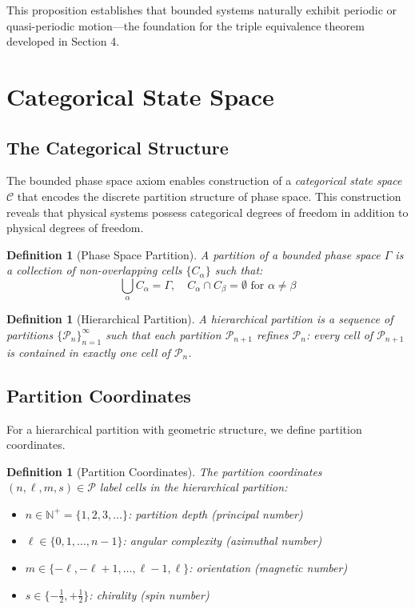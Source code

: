 \documentclass[twocolumn,10pt,twoside]{article}
\newtheorem{definition}[theorem]{Definition}
\newcommand{\N}{\mathbb{N}}
\newcommand{\Cat}{\mathcal{C}}
\newcommand{\Part}{\mathcal{P}}
\newcommand{\partcoord}{(n,\ell,m,s)}
\begin{document}
This proposition establishes that bounded systems naturally exhibit periodic or quasi-periodic motion---the foundation for the triple equivalence theorem developed in Section 4.

\section{Categorical State Space}

\subsection{The Categorical Structure}

The bounded phase space axiom enables construction of a \textit{categorical state space} $\Cat$ that encodes the discrete partition structure of phase space. This construction reveals that physical systems possess categorical degrees of freedom in addition to physical degrees of freedom.

\begin{definition}[Phase Space Partition]
A partition of a bounded phase space $\Gamma$ is a collection of non-overlapping cells $\{C_\alpha\}$ such that:
\begin{equation}
\bigcup_\alpha C_\alpha = \Gamma, \quad C_\alpha \cap C_\beta = \emptyset \text{ for } \alpha \neq \beta
\end{equation}
\end{definition}

\begin{definition}[Hierarchical Partition]
A hierarchical partition is a sequence of partitions $\{\mathcal{P}_n\}_{n=1}^{\infty}$ such that each partition $\mathcal{P}_{n+1}$ refines $\mathcal{P}_n$: every cell of $\mathcal{P}_{n+1}$ is contained in exactly one cell of $\mathcal{P}_n$.
\end{definition}

\subsection{Partition Coordinates}

For a hierarchical partition with geometric structure, we define partition coordinates.

\begin{definition}[Partition Coordinates]
\label{def:partition_coords}
The partition coordinates $\partcoord \in \Part$ label cells in the hierarchical partition:
\begin{itemize}
    \item $n \in \N^+ = \{1, 2, 3, \ldots\}$: partition depth (principal number)
    \item $\ell \in \{0, 1, \ldots, n-1\}$: angular complexity (azimuthal number)
    \item $m \in \{-\ell, -\ell+1, \ldots, \ell-1, \ell\}$: orientation (magnetic number)
    \item $s \in \{-\frac{1}{2}, +\frac{1}{2}\}$: chirality (spin number)
\end{itemize}
\end{definition}
\end{document}
